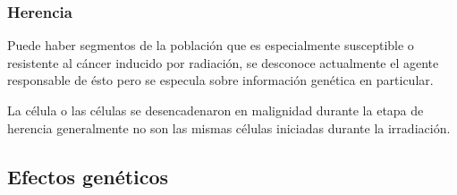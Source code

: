 \documentclass{beamer}
\begin{document}
\begin{frame}

 	\frametitle{Herencia}
   
 \begin{block}{}
 	    Puede haber segmentos de la población que es especialmente susceptible o resistente al cáncer inducido por radiación, se desconoce actualmente el agente responsable de ésto pero se especula sobre información genética en particular.
 \end{block}   
   
   \begin{block}{}
   	La célula o las células se desencadenaron en malignidad durante la etapa de herencia generalmente no son las mismas células iniciadas durante la irradiación.
   \end{block} 
    
\end{frame}
   

\subsection{Efectos genéticos}


\end{document}
